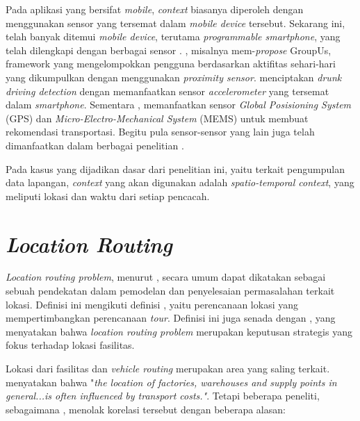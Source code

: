 Pada aplikasi yang bersifat \textit{mobile}, \textit{context} biasanya diperoleh dengan menggunakan sensor yang tersemat dalam \textit{mobile device} tersebut. Sekarang ini, telah banyak ditemui \textit{mobile device}, terutama \textit{programmable smartphone}, yang telah dilengkapi dengan berbagai sensor \citep{cao_mobile_2015}. \citep{do_groupus:_2011}, misalnya mem-\textit{propose} GroupUs, framework yang mengelompokkan pengguna berdasarkan aktifitas sehari-hari yang dikumpulkan dengan menggunakan \textit{proximity sensor}. \citep{dai_mobile_2010} menciptakan \textit{drunk driving detection} dengan memanfaatkan sensor \textit{accelerometer} yang tersemat dalam \textit{smartphone}. Sementara \citep{zou_context-aware_2016}, memanfaatkan sensor \textit{Global Posisioning System} (GPS) dan \textit{Micro-Electro-Mechanical System} (MEMS) untuk membuat rekomendasi transportasi. Begitu pula sensor-sensor yang lain juga telah dimanfaatkan dalam berbagai penelitian \citep{dai_perfalld:_2010, lu_soundsense:_2009, bao_movi:_2010, rubel_toward_2005, atzmueller_towards_2013}.


Pada kasus yang dijadikan dasar dari penelitian ini, yaitu terkait pengumpulan data lapangan, \textit{context} yang akan digunakan adalah \textit{spatio-temporal context}, yang meliputi lokasi dan waktu dari setiap pencacah.


\section{\textit{Location Routing}}
\label{sec:location-routing}
\textit{Location routing problem}, menurut \citep{nagy_location-routing:_2007}, secara umum dapat dikatakan sebagai sebuah pendekatan dalam pemodelan dan penyelesaian permasalahan terkait lokasi. Definisi ini mengikuti definisi \citep{bruns_zweistufige_1998}, yaitu perencanaan lokasi yang mempertimbangkan perencanaan \textit{tour}. Definisi ini juga senada dengan \citep{balakrishnan_integrated_1987}, yang menyatakan bahwa \textit{location routing problem} merupakan keputusan strategis yang fokus terhadap lokasi fasilitas.


Lokasi dari fasilitas dan \textit{vehicle routing} merupakan area yang saling terkait. \citep{maranzana_location_1964} menyatakan bahwa "\textit{the location of factories, warehouses and supply points in general...is often influenced by transport costs."}. Tetapi beberapa peneliti, sebagaimana \citep{nagy_location-routing:_2007}, menolak korelasi tersebut dengan beberapa alasan:

